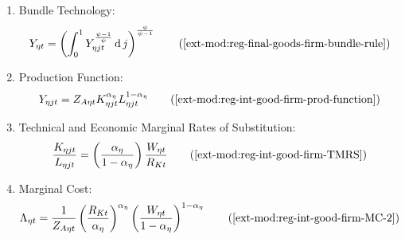 \documentclass[../thesis.tex]{subfiles}
\begin{document}
{\begin{itemize}
\begin{enumerate}
\begin{comment}
		\end{comment}
		
		\item Bundle Technology:
		\begin{align}
			Y_{\eta t} = \left( \int_{0}^{1} Y_{\eta jt}^{\frac{\psi-1}{\psi}} \dif j \right)^{\frac{\psi}{\psi-1}} \tag{\ref{ext-mod:reg-final-goods-firm-bundle-rule}}
		\end{align}
		
		\item Production Function:
		\begin{align}
			Y_{\eta jt} = Z_{A\eta t} K_{\eta jt}^{\alpha_{\eta}} L_{\eta jt}^{1-{\alpha_{\eta}}} 
			\tag{\ref{ext-mod:reg-int-good-firm-prod-function}}
		\end{align}

		\item Technical and Economic Marginal Rates of Substitution:
		\begin{align}
			\frac{K_{\eta jt}}{L_{\eta jt}} = \left( \frac{{\alpha_{\eta}}}{1-\alpha_{\eta}} \right) \frac{W_{\eta t}}{R_{Kt}} \tag{\ref{ext-mod:reg-int-good-firm-TMRS}}
		\end{align}

\begin{comment}
	\item Capital Demand: 
	\begin{align}
		K_{\eta jt} & = \frac{Y_{\eta jt}}{Z_{A\eta t}} \left[ \left( \frac{{\alpha_{\eta}}}{1-\alpha_{\eta}} \right) \frac{W_{\eta t}}{R_{Kt}}\right]^{1-\alpha_{\eta}} \tag{\ref{ext-mod:reg-int-good-firm-Kt-demand}}
	\end{align}
	
	\item Labor Demand:
	\begin{align}
		L_{\eta jt} & = \frac{Y_{\eta jt}}{Z_{A\eta t}} \left[ \left( \frac{{\alpha_{\eta}}}{1-\alpha_{\eta}} \right) \frac{W_{\eta t}}{R_{Kt}}\right]^{-{\alpha_{\eta}}} \tag{\ref{ext-mod:reg-int-good-firm-Lt-demand}}
	\end{align}
\end{comment}

		\item Marginal Cost:
		\begin{align}
			\Lambda_{\eta t} = \frac{1}{Z_{A\eta t}} \left( \frac{R_{Kt}}{{\alpha_{\eta}}} \right)^{{\alpha_{\eta}}} \left( \frac{W_{\eta t}}{1-\alpha_{\eta}} \right)^{1-\alpha_{\eta}} \tag{\ref{ext-mod:reg-int-good-firm-MC-2}}
		\end{align}


\end{enumerate}
\end{itemize}}
\end{document}
